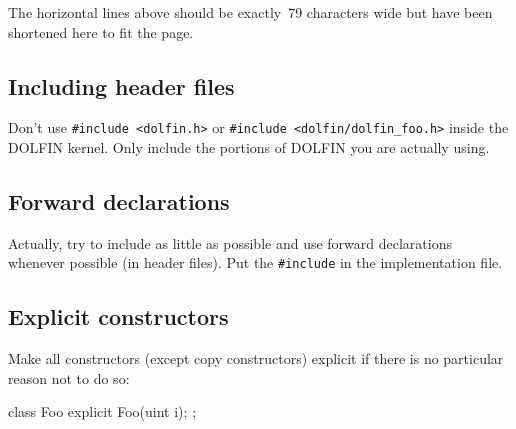 The horizontal lines above should be exactly~79 characters
wide but have been shortened here to fit the page.

\subsection{Including header files}

Don't use \texttt{\#include <dolfin.h>} or \texttt{\#include
  <dolfin/dolfin\_foo.h>} inside the DOLFIN kernel. Only include the
portions of DOLFIN you are actually using.

\subsection{Forward declarations}

Actually, try to include as little as possible and use forward
declarations whenever possible (in header files). Put the
\texttt{\#include} in the implementation file.

\subsection{Explicit constructors}

Make all constructors (except copy constructors) explicit if there is no particular
reason not to do so:
\begin{code}
class Foo
{
  explicit Foo(uint i);
};
\end{code}
